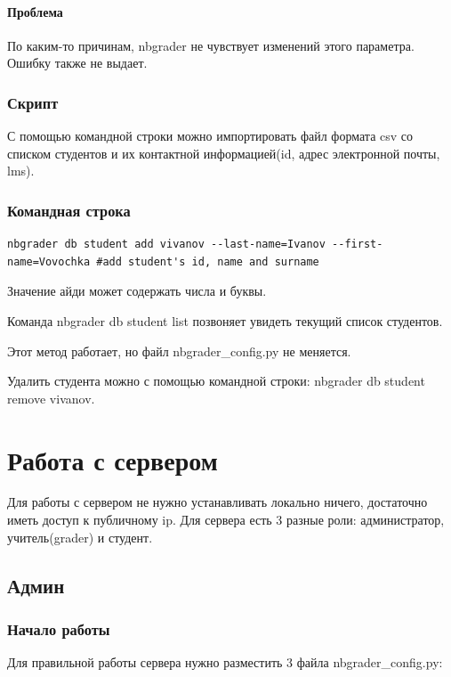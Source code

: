 \documentclass[a4paper,12pt]{article}
\begin{document}
\paragraph{Проблема}По каким-то причинам, nbgrader не чувствует изменений этого параметра. Ошибку также не выдает.
\subsubsection{Скрипт}

С помощью командной строки можно импортировать файл формата csv со списком студентов и их контактной информацией(id, адрес электронной почты, lms).
\subsubsection{Командная строка}

\begin{verbatim} 
nbgrader db student add vivanov --last-name=Ivanov --first-name=Vovochka #add student's id, name and surname
\end{verbatim}
Значение айди может содержать числа и буквы.

Команда nbgrader db student list позвоняет увидеть текущий список студентов.

Этот метод работает, но файл nbgrader\_config.py не меняется.

Удалить студента можно с помощью командной строки: nbgrader db student remove vivanov.
\section{Работа с сервером}

Для работы с сервером не нужно устанавливать локально ничего, достаточно иметь доступ к публичному ip. Для сервера есть 3 разные роли: администратор, учитель(grader) и студент.

\subsection{Админ}
\subsubsection{Начало работы}
Для правильной работы сервера нужно разместить 3 файла nbgrader\_config.py:
\end{document}
